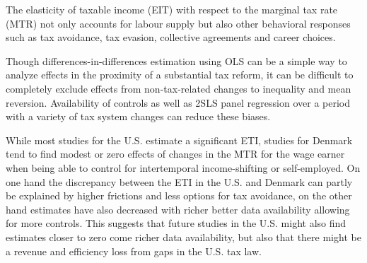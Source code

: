 \label{sec:conclusion}
The elasticity of taxable income (EIT) with respect to the marginal tax rate (MTR) not only accounts for labour supply but also other behavioral responses such as tax avoidance, tax evasion, collective agreements and career choices.

Though differences-in-differences estimation using OLS can be a simple way to analyze effects in the proximity of a substantial tax reform, it can be difficult to completely exclude effects from non-tax-related changes to inequality and mean reversion. Availability of controls as well as 2SLS panel regression over a period with a variety of tax system changes can reduce these biases.

While most studies for the U.S. estimate a significant ETI, studies for Denmark tend to find modest or zero effects of changes in the MTR for the wage earner when being able to control for intertemporal income-shifting or self-employed. On one hand the discrepancy between the ETI in the U.S. and Denmark can partly be explained by higher frictions and less options for tax avoidance, on the other hand estimates have also decreased with richer better data availability allowing for more controls. This suggests that future studies in the U.S. might also find estimates closer to zero come richer data availability, but also that there might be a revenue and efficiency loss from gaps in the U.S. tax law.
